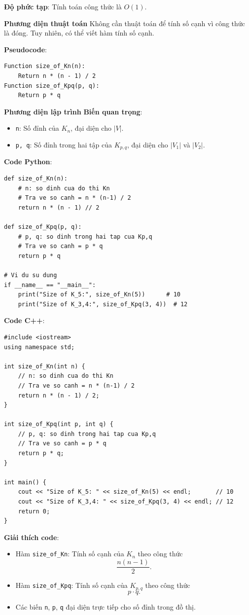 \documentclass[a4paper,12pt]{article}
\begin{document}
\textbf{Độ phức tạp}: Tính toán công thức là \( O(1) \).

\textbf{Phương diện thuật toán}
Không cần thuật toán để tính số cạnh vì công thức là đóng. Tuy nhiên, có thể viết hàm tính số cạnh.

\textbf{Pseudocode}:
\begin{verbatim}
Function size_of_Kn(n):
    Return n * (n - 1) / 2
Function size_of_Kpq(p, q):
    Return p * q
\end{verbatim}

\textbf{Phương diện lập trình}
\textbf{Biến quan trọng}:
\begin{itemize}
    \item \texttt{n}: Số đỉnh của \( K_n \), đại diện cho \( |V| \).
    \item \texttt{p, q}: Số đỉnh trong hai tập của \( K_{p,q} \), đại diện cho \( |V_1| \) và \( |V_2| \).
\end{itemize}

\textbf{Code Python}:
\lstset{language=Python}
\begin{lstlisting}
def size_of_Kn(n):
    # n: so dinh cua do thi Kn
    # Tra ve so canh = n * (n-1) / 2
    return n * (n - 1) // 2

def size_of_Kpq(p, q):
    # p, q: so dinh trong hai tap cua Kp,q
    # Tra ve so canh = p * q
    return p * q

# Vi du su dung
if __name__ == "__main__":
    print("Size of K_5:", size_of_Kn(5))      # 10
    print("Size of K_3,4:", size_of_Kpq(3, 4))  # 12
\end{lstlisting}

\bigskip
\textbf{Code C++}:
\lstset{language=C++}
\begin{lstlisting}
#include <iostream>
using namespace std;

int size_of_Kn(int n) {
    // n: so dinh cua do thi Kn
    // Tra ve so canh = n * (n-1) / 2
    return n * (n - 1) / 2;
}

int size_of_Kpq(int p, int q) {
    // p, q: so dinh trong hai tap cua Kp,q
    // Tra ve so canh = p * q
    return p * q;
}

int main() {
    cout << "Size of K_5: " << size_of_Kn(5) << endl;       // 10
    cout << "Size of K_3,4: " << size_of_Kpq(3, 4) << endl; // 12
    return 0;
}
\end{lstlisting}

\bigskip
\textbf{Giải thích code}:
\begin{itemize}
    \item Hàm \texttt{size\_of\_Kn}: Tính số cạnh của \(K_n\) theo công thức
    \[
      \frac{n(n-1)}{2}.
    \]
    \item Hàm \texttt{size\_of\_Kpq}: Tính số cạnh của \(K_{p,q}\) theo công thức
    \[
      p \cdot q.
    \]
    \item Các biến \texttt{n}, \texttt{p}, \texttt{q} đại diện trực tiếp cho số đỉnh trong đồ thị.
\end{itemize}
\end{document}
